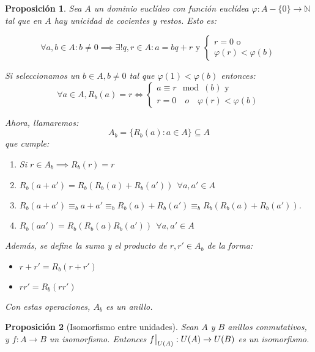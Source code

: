\documentclass[11pt, a4paper, titlepage]{article}
\makeatletter
\newif\IfInSansMode
\let\oldsf\sffamily
\renewcommand*{\sffamily}{\oldsf\mathversion{sans}\InSansModetrue}
\let\oldnorm\normalfont
\renewcommand*{\normalfont}{\oldnorm\InSansModefalse\mathversion{normal}}
\renewenvironment{proof}[1][\proofname] {\vspace{-15pt}\par\pushQED{\qed}\normalfont\topsep6\p@\@plus6\p@\relax\trivlist\item[\hskip\labelsep\it#1\@addpunct{.}]\ignorespaces}{\popQED\endtrivlist\@endpefalse}
\providecommand{\nat}{\mathbb{N}}
\newcommand\restr[2]{{%
  \left.\kern-\nulldelimiterspace %
  #1 %
  \vphantom{\big|} %
  \right|_{#2} %
  }}
\renewenvironment{proof}[1][\proofname] {\par\pushQED{\qed}\normalfont\topsep6\p@\@plus6\p@\relax\trivlist\item[\hskip\labelsep\itshape\sffamily#1\@addpunct{.}]\ignorespaces}{\popQED\endtrivlist\@endpefalse}
\theoremstyle{theorem-style}
\newtheorem{nprop}{Proposición}[section]
\theoremstyle{definition-style}
\theoremstyle{remark-style}
\theoremstyle{example-style}
\makeatother
\begin{document}
\begin{nprop}
  Sea $A$ un dominio euclídeo con función euclídea $\varphi :A-\{0\} \to \nat$ tal que en $A$ hay unicidad de cocientes y restos. Esto es:

  $$\forall a,b \in A: b\ne 0 \implies \exists ! q,r\in A : a=bq+r \text{ y } \begin{cases}
	r = 0 \text{ o} \\
	\varphi(r) < \varphi(b)
  \end{cases}$$

  Si seleccionamos un $b \in A, b \ne 0$ tal que $\varphi(1) < \varphi(b)$ entonces:\\

  $$\forall a \in A, R_b(a) = r \iff \begin{cases}
	a \equiv r \mod(b) \text{ y} \\
	r = 0 \quad o \quad \varphi(r) < \varphi(b)
  \end{cases}$$

Ahora, llamaremos: $$ A_b = \{ R_b(a): a \in A\} \subseteq A$$ que cumple:

\begin{enumerate}
	\item Si $r\in A_b \implies R_b(r) = r$
	\item $R_b(a+a') = R_b(R_b(a) + R_b(a')) \ \ \forall a,a' \in A$ \\
	\begin{proof}
	$R_b(a+a') \equiv_b a+a' \equiv_b R_b(a) +R_b(a') \equiv_b R_b(R_b(a) + R_b(a'))$.
\end{proof}
	\item $R_b(aa') = R_b(R_b(a)R_b(a')) \ \ \forall a,a' \in A$
\end{enumerate}

Además, se define la suma y el producto de $r,r' \in A_b$ de la forma:
\begin{itemize}
	\item $r+r' = R_b(r+r')$
	\item $rr' = R_b(rr')$
\end{itemize}

Con estas operaciones, $A_b$ es un anillo.
\end{nprop}

\begin{nprop}[Isomorfismo entre unidades]
  Sean $A$ y $B$ anillos conmutativos, y $f: A \to B$ un isomorfismo. Entonces $\restr{f}{U(A)} : U(A) \to U(B)$
  es un isomorfismo.
\end{nprop}
\end{document}
